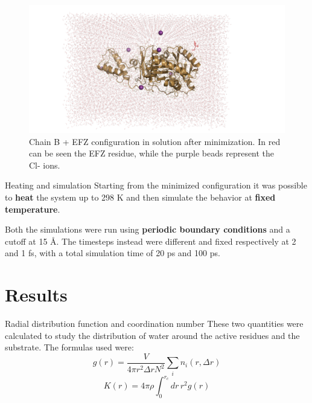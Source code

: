 \documentclass{beamer}
\begin{document}
\begin{frame}
    \begin{figure}
        \centering
        \includegraphics[width=0.8\linewidth, clip, trim= 0 0 0 0]{../figures/chain_b_efz_solv.png}
        \caption{Chain B + EFZ configuration in solution after minimization. In red can be seen the EFZ residue, while the purple beads represent the Cl- ions.\label{fig:chain_b_efz_solv}}
    \end{figure}
\end{frame}

\begin{frame}{Heating and simulation}
    Starting from the minimized configuration it was possible to \textbf{heat} the system up to 298 K and then simulate the behavior at \textbf{fixed temperature}.

    Both the simulations were run using \textbf{periodic boundary conditions} and a cutoff at 15 \AA. The timesteps instead were different and fixed respectively at 2 and 1 fs, with a total simulation time of 20 ps and 100 ps.
\end{frame}

\section{Results}
\begin{frame}{Radial distribution function and coordination number}
    These two quantities were calculated to study the distribution of water around the active residues and the substrate. The formulas used were:
    \begin{equation}
        g(r) = \frac{V}{4\pi r^2 \Delta r N^2}\sum_i n_i(r,\Delta r)
        \label{eq:gofr}
    \end{equation}
    \begin{equation}
        K(r) = 4\pi \rho \int_{0}^{r_c} dr \, r^2 g(r)
        \label{eq:kofr}
    \end{equation}
\end{frame}
\end{document}
